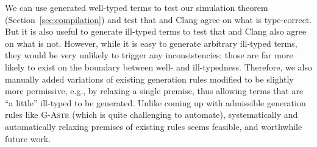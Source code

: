 
%
We can use generated well-typed terms to test our simulation theorem
(Section~\ref{sec:compilation}) and test that \lang and \checkedc
Clang agree on what is type-correct. But it is also useful to generate
ill-typed terms to test that \lang and \checkedc Clang also agree on
what is not.  However, while it is easy to generate arbitrary
ill-typed terms, they would be very unlikely to trigger any
inconsistencies; those are far more likely to exist on the boundary
between well- and ill-typedness. Therefore, we also manually added
variations of existing generation rules modified to be slightly more
permissive, e.g., by relaxing a single premise, thus allowing terms
that are ``a little'' ill-typed to be generated. Unlike coming up with
admissible generation rules like \textsc{G-Astr} (which is quite
challenging to automate), systematically and automatically relaxing
premises of existing rules seems feasible, and worthwhile future work.



